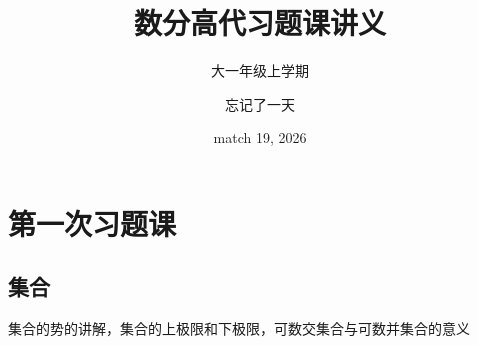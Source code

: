 \documentclass[lang=cn,12pt]{elegantbook}
\title{数分高代习题课讲义}
\subtitle{大一年级上学期}
\author{忘记了一天}
\institute{XTU\_data\_2}
\date{match 19, 2026}
\begin{document}
\maketitle

\frontmatter

\tableofcontents

\mainmatter



\chapter{第一次习题课}

\section{集合}
集合的势的讲解，集合的上极限和下极限，可数交集合与可数并集合的意义
\end{document}
